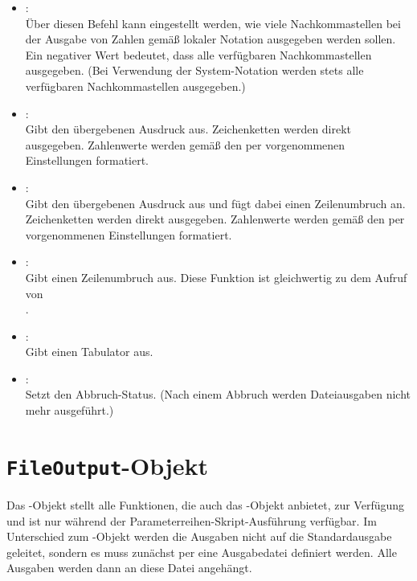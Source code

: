 \begin{itemize}
\item
{}:\\
Über diesen Befehl kann eingestellt werden, wie viele Nachkommastellen bei der
Ausgabe von Zahlen gemäß lokaler Notation ausgegeben werden sollen. Ein
negativer Wert bedeutet, dass alle verfügbaren Nachkommastellen ausgegeben.
(Bei Verwendung der System-Notation werden stets alle verfügbaren Nachkommastellen ausgegeben.)

\item
{}:\\
Gibt den übergebenen Ausdruck aus.
Zeichenketten werden direkt ausgegeben. Zahlenwerte werden gemäß den per
 vorgenommenen Einstellungen formatiert.

\item
{}:\\
Gibt den übergebenen Ausdruck aus und fügt dabei einen Zeilenumbruch an.
Zeichenketten werden direkt ausgegeben. Zahlenwerte werden gemäß den per
 vorgenommenen Einstellungen formatiert.

\item
{}:\\
Gibt einen Zeilenumbruch aus. Diese Funktion ist gleichwertig zu dem Aufruf von\\
.

\item
{}:\\
Gibt einen Tabulator aus.

\item
{}:\\
Setzt den Abbruch-Status. (Nach einem Abbruch werden Dateiausgaben nicht mehr ausgeführt.)

\end{itemize}



\chapter{\texttt{FileOutput}-Objekt}

Das -Objekt stellt alle Funktionen, die auch das
-Objekt anbietet, zur Verfügung und ist nur während
der Parameterreihen-Skript-Ausführung verfügbar. Im Unterschied
zum -Objekt werden die Ausgaben nicht auf die Standardausgabe
geleitet, sondern es muss zunächst per 
eine Ausgabedatei definiert werden. Alle Ausgaben werden dann an diese
Datei angehängt.



